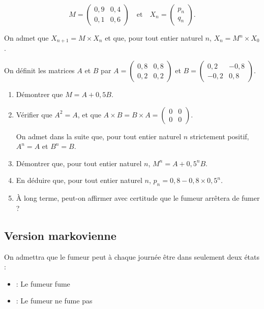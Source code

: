 \documentclass[oneside,12pt]{article}
\begin{document}
\[M = \begin{pmatrix}0,9& 0,4\\0,1& 0,6\end{pmatrix}\quad \text{et}\quad X_n = \begin{pmatrix}p_n\\q_n \end{pmatrix}.\]

On admet que $X_{n+1} = M \times X_n$ et que, pour tout entier naturel $n$,\: $X_n = M^n \times X_0$.

On définit les matrices $A$ et $B$ par $A = \begin{pmatrix}0,8&0,8\\0,2&0,2\end{pmatrix}$ et $B = \begin{pmatrix}0,2& -0,8\\-0,2&0,8\end{pmatrix}$.

\begin{enumerate}
	\item Démontrer que $M = A + 0,5B$.
	\item Vérifier que $A^2 = A$, et que $A \times B = B \times A = \begin{pmatrix}0& 0\\0& 0\end{pmatrix}$.
		
On admet dans la suite que, pour tout entier naturel $n$ strictement positif, $A^n = A$ et $B^n = B$.
	\item Démontrer que, pour tout entier naturel $n$,\: $M^n = A + 0,5^n B$.
	\item En déduire que, pour tout entier naturel $n$,\: $p_n = 0,8 - 0,8 \times 0,5^n$.
	\item À long terme, peut-on affirmer avec certitude que le fumeur arrêtera de fumer ?
\end{enumerate}


\subsection{Version markovienne}
On admettra que le fumeur peut à chaque journée être dans seulement deux états :
\setlength\parindent{6mm}
\begin{itemize}
\item[A] : \og Le fumeur fume \fg
\item[B] : \og Le fumeur ne fume pas \fg
\end{itemize}
\setlength\parindent{0mm}
\end{document}
